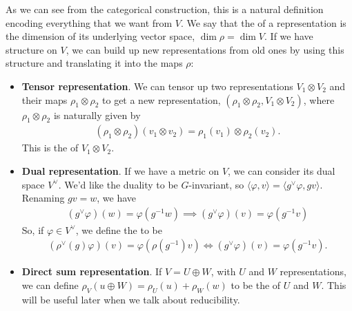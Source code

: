 \documentclass[11pt]{article}
\begin{document}
As we can see from the categorical construction, this is a natural definition 
encoding everything that we want from $V$. We say that the  of 
a representation is the dimension of its underlying vector space, 
$\dim{\rho} = \dim{V}$. If we have structure on $V$, we can build up new 
representations from old ones by using this structure and translating it into 
the maps $\rho$:
\begin{itemize}
    \item \textbf{Tensor representation}. We can tensor up two representations
    $V_1 \otimes V_2$ and their maps $\rho_1 \otimes \rho_2$ to get a new representation,
    $(\rho_1 \otimes \rho_2, V_1 \otimes V_2)$, where $\rho_1 \otimes \rho_2$ is
    naturally given by
    \begin{align*}
        (\rho_1 \otimes \rho_2)(v_1 \otimes v_2) = \rho_1(v_1) \otimes \rho_2(v_2).
    \end{align*}
    This is the  of $V_1 \otimes V_2$.
    \item \textbf{Dual representation}. If we have a metric on $V$,
    we can consider its dual space $V^\vee$. We'd like the duality to
    be $G$-invariant, so $\langle \varphi, v \rangle = \langle g^{\vee} \varphi, g v \rangle$.
    Renaming $g v = w$, we have
    \begin{align*}
        (g^\vee \varphi)(w) = \varphi(g^{-1}w) \implies (g^\vee \varphi)(v) = \varphi(g^{-1}v)
    \end{align*}
    So, if $\varphi \in V^\vee$, we define the  
    to be
    \begin{align*}
        (\rho^\vee(g) \varphi)(v) = \varphi(\rho(g^{-1})v)
        \iff
        (g^\vee \varphi)(v) = \varphi(g^{-1}v).
    \end{align*}
    \item \textbf{Direct sum representation}. If $V = U \oplus W$,
    with $U$ and $W$ representations, we can define
    $\rho_V(u \oplus W) = \rho_U(u) + \rho_W(w)$ to be the
     of $U$ and $W$.
    This will be useful later when we talk about reducibility.
\end{itemize}
\end{document}

